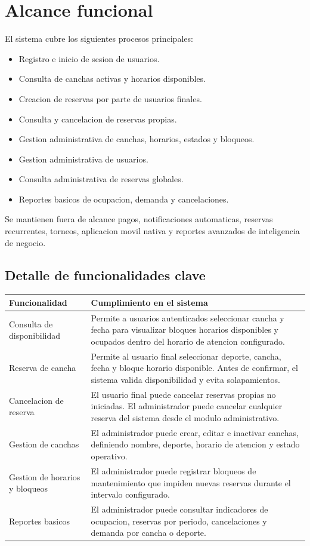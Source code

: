 \documentclass[12pt,a4paper]{article}
\begin{document}
\section{Alcance funcional}

El sistema cubre los siguientes procesos principales:

\begin{itemize}
  \item Registro e inicio de sesion de usuarios.
  \item Consulta de canchas activas y horarios disponibles.
  \item Creacion de reservas por parte de usuarios finales.
  \item Consulta y cancelacion de reservas propias.
  \item Gestion administrativa de canchas, horarios, estados y bloqueos.
  \item Gestion administrativa de usuarios.
  \item Consulta administrativa de reservas globales.
  \item Reportes basicos de ocupacion, demanda y cancelaciones.
\end{itemize}

Se mantienen fuera de alcance pagos, notificaciones automaticas, reservas recurrentes, torneos, aplicacion movil nativa y reportes avanzados de inteligencia de negocio.

\subsection{Detalle de funcionalidades clave}

\begin{longtable}{p{4cm}p{10cm}}
\textbf{Funcionalidad} & \textbf{Cumplimiento en el sistema} \\
\hline
Consulta de disponibilidad & Permite a usuarios autenticados seleccionar cancha y fecha para visualizar bloques horarios disponibles y ocupados dentro del horario de atencion configurado. \\
Reserva de cancha & Permite al usuario final seleccionar deporte, cancha, fecha y bloque horario disponible. Antes de confirmar, el sistema valida disponibilidad y evita solapamientos. \\
Cancelacion de reserva & El usuario final puede cancelar reservas propias no iniciadas. El administrador puede cancelar cualquier reserva del sistema desde el modulo administrativo. \\
Gestion de canchas & El administrador puede crear, editar e inactivar canchas, definiendo nombre, deporte, horario de atencion y estado operativo. \\
Gestion de horarios y bloqueos & El administrador puede registrar bloqueos de mantenimiento que impiden nuevas reservas durante el intervalo configurado. \\
Reportes basicos & El administrador puede consultar indicadores de ocupacion, reservas por periodo, cancelaciones y demanda por cancha o deporte. \\
\end{longtable}
\end{document}
